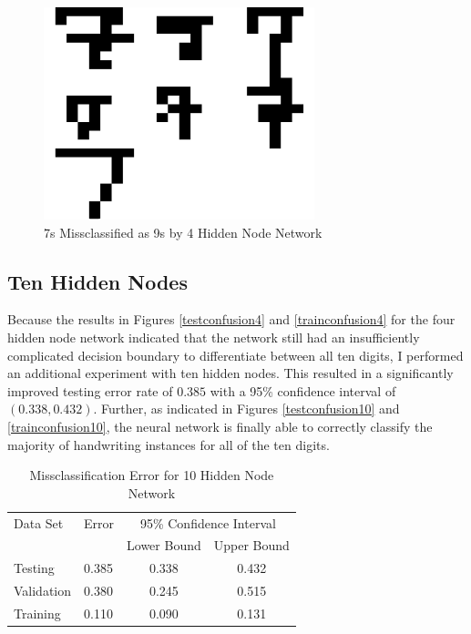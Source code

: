 \documentclass{article}
\begin{document}
\begin{figure}
\centering
\includegraphics[width=0.7\textwidth]{data/final/4_test_7missclass9.png}
\caption{7s Missclassified as 9s by 4 Hidden Node Network}
\label{4_7missclass9}
\end{figure}

\subsection{Ten Hidden Nodes}\label{hidden10}

Because the results in Figures \ref{testconfusion4} and \ref{trainconfusion4} for the four hidden node network indicated that the network still had an insufficiently complicated decision boundary to differentiate between all ten digits, I performed an additional experiment with ten hidden nodes. This resulted in a significantly improved testing error rate of \(0.385\) with a 95\% confidence interval of \((0.338 , 0.432)\). Further, as indicated in Figures \ref{testconfusion10} and \ref{trainconfusion10}, the neural network is finally able to correctly classify the majority of handwriting instances for all of the ten digits.

\begin{table}
\caption{Missclassification Error for 10 Hidden Node Network}
\begin{center}
\begin{tabular}{llcc}
\toprule
Data Set & Error & \multicolumn{2}{c}{95\% Confidence Interval} \\
\cmidrule(r){3-4}
& & Lower Bound & Upper Bound \\
\midrule
Testing       & 0.385 &  0.338 & 0.432  \\
Validation    & 0.380 &  0.245 & 0.515  \\
Training      & 0.110 &  0.090 & 0.131  \\
\bottomrule
\end{tabular}
\label{table10}
\end{center}
\end{table}
\end{document}
